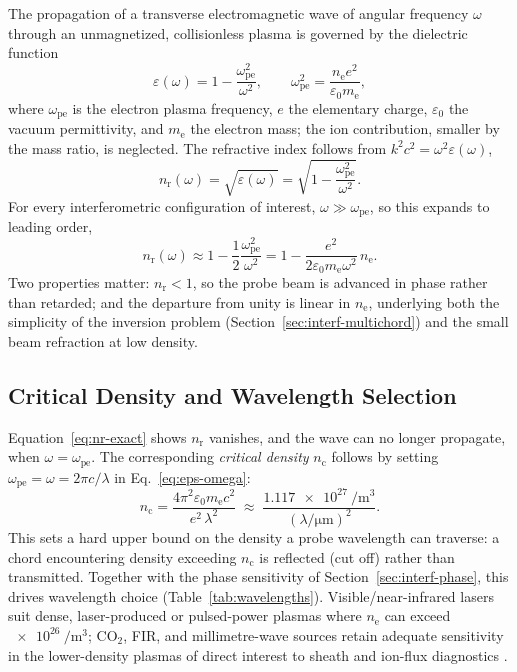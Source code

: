 The propagation of a transverse electromagnetic wave of angular frequency $\omega$ through an unmagnetized, collisionless plasma is governed by the dielectric function
\begin{equation}
\varepsilon(\omega) = 1 - \frac{\omega_{\mathrm{pe}}^{2}}{\omega^{2}}, \qquad
\omega_{\mathrm{pe}}^{2} = \frac{n_{\mathrm{e}} e^{2}}{\varepsilon_{0} m_{\mathrm{e}}},
\label{eq:eps-omega}
\end{equation}
where $\omega_{\mathrm{pe}}$ is the electron plasma frequency, $e$ the elementary charge, $\varepsilon_{0}$ the vacuum permittivity, and $m_{\mathrm{e}}$ the electron mass; the ion contribution, smaller by the mass ratio, is neglected. The refractive index follows from $k^{2}c^{2} = \omega^{2}\varepsilon(\omega)$,
\begin{equation}
n_{\mathrm{r}}(\omega) = \sqrt{\varepsilon(\omega)} = \sqrt{1 - \frac{\omega_{\mathrm{pe}}^{2}}{\omega^{2}}}.
\label{eq:nr-exact}
\end{equation}
For every interferometric configuration of interest, $\omega \gg \omega_{\mathrm{pe}}$, so this expands to leading order,
\begin{equation}
n_{\mathrm{r}}(\omega) \approx 1 - \frac{1}{2}\frac{\omega_{\mathrm{pe}}^{2}}{\omega^{2}}
= 1 - \frac{e^{2}}{2\varepsilon_{0} m_{\mathrm{e}} \omega^{2}}\, n_{\mathrm{e}}.
\label{eq:nr-approx}
\end{equation}
Two properties matter: $n_{\mathrm{r}} < 1$, so the probe beam is advanced in phase rather than retarded; and the departure from unity is linear in $n_{\mathrm{e}}$, underlying both the simplicity of the inversion problem (Section~\ref{sec:interf-multichord}) and the small beam refraction at low density.

\subsection{Critical Density and Wavelength Selection}

Equation~\eqref{eq:nr-exact} shows $n_{\mathrm{r}}$ vanishes, and the wave can no longer propagate, when $\omega = \omega_{\mathrm{pe}}$. The corresponding \emph{critical density} $n_{\mathrm{c}}$ follows by setting $\omega_{\mathrm{pe}}=\omega=2\pi c/\lambda$ in Eq.~\eqref{eq:eps-omega}:
\begin{equation}
n_{\mathrm{c}} = \frac{4\pi^{2}\varepsilon_{0} m_{\mathrm{e}} c^{2}}{e^{2}\,\lambda^{2}}
\;\approx\; \frac{\SI{1.117e27}{\per\cubic\meter}}{\left(\lambda/\si{\micro\meter}\right)^{2}}.
\label{eq:ncrit}
\end{equation}
This sets a hard upper bound on the density a probe wavelength can traverse: a chord encountering density exceeding $n_{\mathrm{c}}$ is reflected (cut off) rather than transmitted. Together with the phase sensitivity of Section~\ref{sec:interf-phase}, this drives wavelength choice (Table~\ref{tab:wavelengths}). Visible/near-infrared lasers suit dense, laser-produced or pulsed-power plasmas where $n_{\mathrm{e}}$ can exceed $\SI{e26}{\per\cubic\meter}$; CO$_{2}$, FIR, and millimetre-wave sources retain adequate sensitivity in the lower-density plasmas of direct interest to sheath and ion-flux diagnostics \cite{ref0400}.

